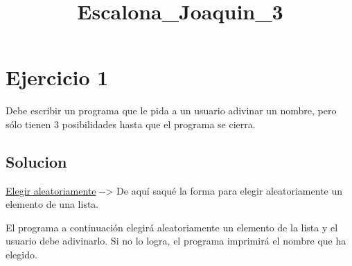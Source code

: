 \documentclass[11pt]{article}
\title{Escalona\_Joaquin\_3}
\begin{document}
    
    
    \maketitle
    
    

    
    \section{Ejercicio 1}\label{ejercicio-1}

Debe escribir un programa que le pida a un usuario adivinar un nombre,
pero sólo tienen 3 posibilidades hasta que el programa se cierra.

\subsection{Solucion}\label{solucion}

\href{https://es.stackoverflow.com/questions/14454/python-extraer-objeto-al-azar-de-una-lista}{Elegir
aleatoriamente} -\/-\textgreater{} De aquí saqué la forma para elegir
aleatoriamente un elemento de una lista.

El programa a continuación elegirá aleatoriamente un elemento de la
lista y el usuario debe adivinarlo. Si no lo logra, el programa
imprimirá el nombre que ha elegido.
\end{document}
